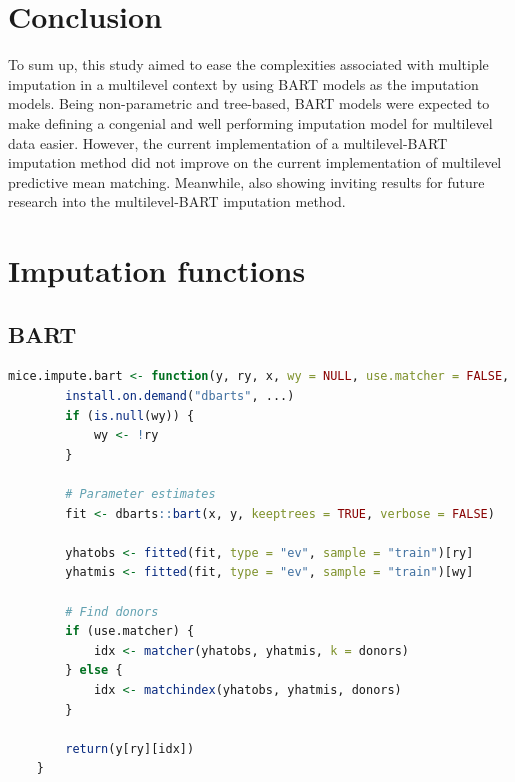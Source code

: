 \documentclass[3p,12pt,a4paper]{elsarticle}
\begin{document}
\section{Conclusion}

To sum up, this study aimed to ease the complexities associated with multiple imputation in a multilevel context by using BART models as the imputation models. Being non-parametric and tree-based, BART models were expected to make defining a congenial and well performing imputation model for multilevel data easier. However, the current implementation of a multilevel-BART imputation method did not improve on the current implementation of multilevel predictive mean matching. Meanwhile, also showing inviting results for future research into the multilevel-BART imputation method.

\newpage



\newpage
\appendix
\section{Imputation functions} \label{appendix:imputationfunctions}
\subsection{BART}
\begin{lstlisting}[language=R, caption = {Imputation function for single-level BART}, label = {lst:singlelevelBART}]
    mice.impute.bart <- function(y, ry, x, wy = NULL, use.matcher = FALSE, donors = 5L, ...) {
        install.on.demand("dbarts", ...)
        if (is.null(wy)) {
            wy <- !ry
        }
    
        # Parameter estimates
        fit <- dbarts::bart(x, y, keeptrees = TRUE, verbose = FALSE)
    
        yhatobs <- fitted(fit, type = "ev", sample = "train")[ry]
        yhatmis <- fitted(fit, type = "ev", sample = "train")[wy]
    
        # Find donors
        if (use.matcher) {
            idx <- matcher(yhatobs, yhatmis, k = donors)
        } else {
            idx <- matchindex(yhatobs, yhatmis, donors)
        }
    
        return(y[ry][idx])
    }
\end{lstlisting}
\end{document}
